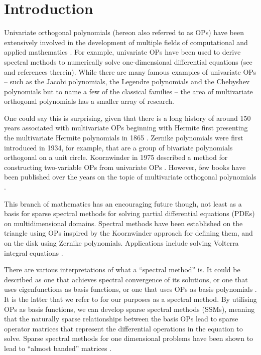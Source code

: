 
\chapter{Introduction}

Univariate orthogonal polynomials (hereon also referred to as OPs) have been extensively involved in the development of multiple fields of computational and applied mathematics \cite{onedimopsrefs} . For example, univariate OPs have been used to derive spectral methods to numerically solve one-dimensional differential equations (see \cite{boyd2001chebyshev, olver2013fast} and references therein). While there are many famous examples of univariate OPs -- such as the Jacobi polynomials, the Legendre polynomials and the Chebyshev polynomials but to name a few of the classical families \cite[Section 18.3]{DLMF} -- the area of multivariate orthogonal polynomials has a smaller array of research. 

One could say this is surprising, given that there is a long history of around 150 years associated with multivariate OPs beginning with Hermite first presenting the multivariate Hermite polynomials in 1865 \cite{appel1926fonctions, ismail2017review}. Zernike polynomials \cite{zernike1934diffraction} were first introduced in 1934, for example, that are a group of bivariate polynomials orthogonal on a unit circle. Koornwinder in 1975 described a method for constructing two-variable OPs from univariate OPs \cite{koornwinder1975two}. However, few books have been published over the years on the topic of multivariate orthogonal polynomials \cite{dunkl2014orthogonal}.

This branch of mathematics has an encouraging future though, not least as a basis for sparse spectral methods for solving partial differential equations (PDEs) on multidimensional domains. Spectral methods have been established on the triangle \cite{olver2019triangle} using OPs inspired by the Koornwinder approach for defining them, and on the disk \cite{vasil2016tensor} using Zernike polynomials. Applications include solving Volterra integral equations \cite{gutleb2020sparse}. 

There are various interpretations of what a \enquote{spectral method} is. It could be described as one that achieves spectral convergence of its solutions, or one that uses eigenfunctions as basis functions, or one that uses OPs as basis polynomials \cite{}. It is the latter that we refer to for our purposes as a spectral method. By utilising OPs as basis functions, we can develop sparse spectral methods (SSMs), meaning that the naturally sparse relationships between the basis OPs lead to sparse operator matrices that represent the differential operations in the equation to solve. Sparse spectral methods for one dimensional problems have been shown to lead to \enquote{almost banded} matrices \cite{olver2013fast}. 

